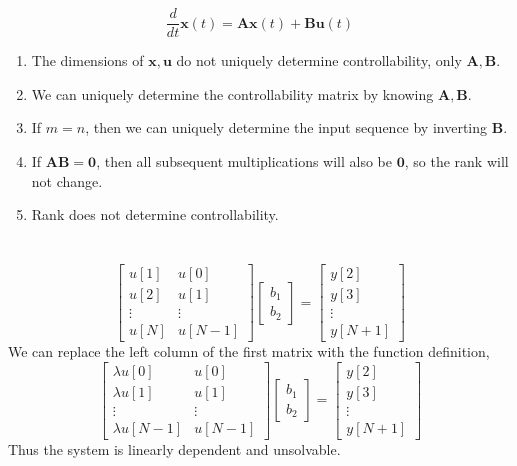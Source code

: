 \documentclass[]{article}
\newcommand{\diff}[1]{\frac{d}{d #1}}
\begin{document}
\section{}

\begin{equation}
	\diff{t} \bm{x}(t) = \bm{Ax}(t) + \bm{Bu}(t)
\end{equation}

\begin{enumerate}
	\item The dimensions of \(\bm{x}, \bm{u}\) do not uniquely determine controllability, only \(\bm{A}, \bm{B}\).
	\item We can uniquely determine the controllability matrix by knowing \(\bm{A}, \bm{B}\).
	\item If \(m = n\), then we can uniquely determine the input sequence by inverting \(\bm{B}\).
	\item If \(\bm{AB} = \bm{0}\), then all subsequent multiplications will also be \(\bm{0}\), so the rank will not change.
	\item Rank does not determine controllability.
\end{enumerate}

\section{}

\begin{equation}
	\begin{bmatrix}
	u[1] & u[0] \\
	u[2] & u[1] \\
	\vdots & \vdots \\
	u[N] & u[N - 1]
	\end{bmatrix}
	\begin{bmatrix}
	b_1 \\
	b_2
	\end{bmatrix} =
	\begin{bmatrix}
	y[2] \\
	y[3] \\
	\vdots \\
	y[N + 1]
	\end{bmatrix}
\end{equation}
We can replace the left column of the first matrix with the function definition,
\begin{equation}
	\begin{bmatrix}
	\lambda u[0] & u[0] \\
	\lambda u[1] & u[1] \\
	\vdots & \vdots \\
	\lambda u[N - 1] & u[N - 1]
	\end{bmatrix}
	\begin{bmatrix}
	b_1 \\
	b_2
	\end{bmatrix} =
	\begin{bmatrix}
	y[2] \\
	y[3] \\
	\vdots \\
	y[N + 1]
	\end{bmatrix}
\end{equation}
Thus the system is linearly dependent and unsolvable.
\end{document}
